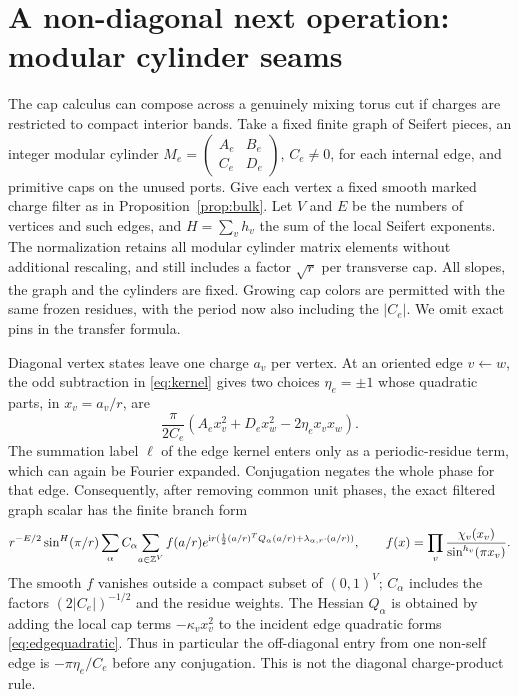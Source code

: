 \section{A non-diagonal next operation: modular cylinder seams}\label{sec:graph}

The cap calculus can compose across a genuinely mixing torus cut if charges are restricted to compact interior bands. Take a fixed finite graph of Seifert pieces, an integer modular cylinder \(M_e=\left(\begin{smallmatrix}A_e&B_e\\ C_e&D_e\end{smallmatrix}\right)\), \(C_e\ne0\), for each internal edge, and primitive caps on the unused ports. Give each vertex a fixed smooth marked charge filter as in Proposition~\ref{prop:bulk}. Let \(V\) and \(E\) be the numbers of vertices and such edges, and \(H=\sum_v h_v\) the sum of the local Seifert exponents. The normalization retains all modular cylinder matrix elements without additional rescaling, and still includes a factor \(\sqrt r\) per transverse cap. All slopes, the graph and the cylinders are fixed. Growing cap colors are permitted with the same frozen residues, with the period now also including the \(|C_e|\). We omit exact pins in the transfer formula.

Diagonal vertex states leave one charge \(a_v\) per vertex. At an oriented edge \(v\leftarrow w\), the odd subtraction in \eqref{eq:kernel} gives two choices \(\eta_e=\pm1\) whose quadratic parts, in \(x_v=a_v/r\), are
\begin{equation}\label{eq:edgequadratic}
 \frac{\pi}{2C_e}\left(A_e x_v^2+D_e x_w^2-2\eta_e x_vx_w\right).
\end{equation}
The summation label \(\ell\) of the edge kernel enters only as a periodic-residue term, which can again be Fourier expanded. Conjugation negates the whole phase for that edge. Consequently, after removing common unit phases, the exact filtered graph scalar has the finite branch form
\begin{equation}\label{eq:graph}
 r^{-E/2}\sin^H(\pi/r)
 \sum_{\alpha}C_\alpha\!
       \sum_{a\in\mathbb Z^V} f(a/r)
      e^{{\rm i} r(\frac12(a/r)^TQ_\alpha(a/r)+\lambda_{\alpha,r}\cdot(a/r))},
 \qquad
 f(x)=\prod_v\frac{\chi_v(x_v)}{\sin^{h_v}(\pi x_v)} .
\end{equation}
The smooth \(f\) vanishes outside a compact subset of \((0,1)^V\); \(C_\alpha\) includes the factors \((2|C_e|)^{-1/2}\) and the residue weights. The Hessian \(Q_\alpha\) is obtained by adding the local cap terms \(-\kappa_v x_v^2\) to the incident edge quadratic forms \eqref{eq:edgequadratic}. Thus in particular the off-diagonal entry from one non-self edge is \(-\pi\eta_e/C_e\) before any conjugation. This is not the diagonal charge-product rule.

